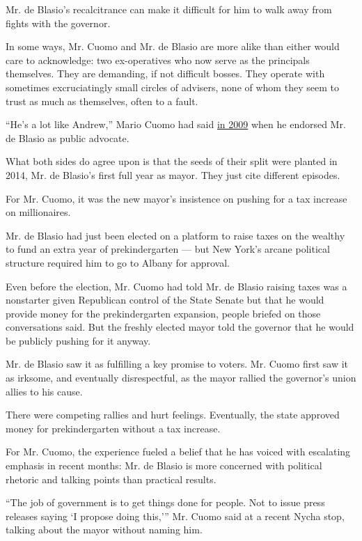 Mr. de Blasio's recalcitrance can make it difficult for him to walk away
from fights with the governor.

In some ways, Mr. Cuomo and Mr. de Blasio are more alike than either
would care to acknowledge: two ex-operatives who now serve as the
principals themselves. They are demanding, if not difficult bosses. They
operate with sometimes excruciatingly small circles of advisers, none of
whom they seem to trust as much as themselves, often to a fault.

``He's a lot like Andrew,'' Mario Cuomo had said
\href{https://cityroom.blogs.nytimes3xbfgragh.onion/2009/08/19/snubbing-green-cuomo-endorses-de-blasio/}{in
2009} when he endorsed Mr. de Blasio as public advocate.

What both sides do agree upon is that the seeds of their split were
planted in 2014, Mr. de Blasio's first full year as mayor. They just
cite different episodes.

For Mr. Cuomo, it was the new mayor's insistence on pushing for a tax
increase on millionaires.

Mr. de Blasio had just been elected on a platform to raise taxes on the
wealthy to fund an extra year of prekindergarten --- but New York's
arcane political structure required him to go to Albany for approval.

Even before the election, Mr. Cuomo had told Mr. de Blasio raising taxes
was a nonstarter given Republican control of the State Senate but that
he would provide money for the prekindergarten expansion, people briefed
on those conversations said. But the freshly elected mayor told the
governor that he would be publicly pushing for it anyway.

Mr. de Blasio saw it as fulfilling a key promise to voters. Mr. Cuomo
first saw it as irksome, and eventually disrespectful, as the mayor
rallied the governor's union allies to his cause.

There were competing rallies and hurt feelings. Eventually, the state
approved money for prekindergarten without a tax increase.

For Mr. Cuomo, the experience fueled a belief that he has voiced with
escalating emphasis in recent months: Mr. de Blasio is more concerned
with political rhetoric and talking points than practical results.

``The job of government is to get things done for people. Not to issue
press releases saying `I propose doing this,''' Mr. Cuomo said at a
recent Nycha stop, talking about the mayor without naming him.

